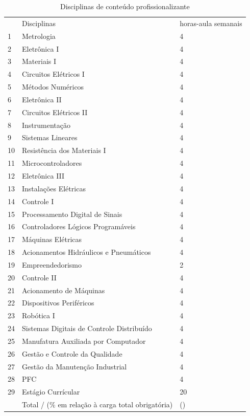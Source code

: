 \begin{destacar}
\begin{longtable}{|p{0.8cm}|p{7.5cm}|p{2.0cm}|}
	\caption{Disciplinas de conteúdo profissionalizante}\label{tab6} 
	\vspace{-0.25cm}
	\\ \hline 
	\cellcolor{\cinza} & \cellcolor{\cinza}Disciplinas & \cellcolor{\cinza}horas-aula semanais  \\ 
	\hline
	1 &  Metrologia  &  4 \\ \hline
	2 &  Eletrônica I  &  4 \\ \hline
	3 &  Materiais I  &  4 \\ \hline
	4 &  Circuitos Elétricos I  &  4 \\ \hline
	5 &  Métodos Numéricos  &  4 \\ \hline
	6 &  Eletrônica II  &  4 \\ \hline
	7 &  Circuitos Elétricos II  &  4 \\ \hline
	8 &  Instrumentação  &  4 \\ \hline
	9 &  Sistemas Lineares  &  4 \\ \hline
	10 &  Resistência dos Materiais I  &  4 \\ \hline
	11 &  Microcontroladores  &  4 \\ \hline
	12 &  Eletrônica III  &  4 \\ \hline
	13 &  Instalações Elétricas  &  4 \\ \hline
	14 &  Controle I  &  4 \\ \hline
	15 &  Processamento Digital de Sinais  &  4 \\ \hline
	16 &  Controladores Lógicos Programáveis  &  4 \\ \hline
	17 &  Máquinas Elétricas  &  4 \\ \hline
	18 &  Acionamentos Hidráulicos e Pneumáticos  &  4 \\ \hline
	19 &  Empreendedorismo  &  2 \\ \hline
	20 &  Controle II  &  4 \\ \hline
	21 &  Acionamento de Máquinas  &  4 \\ \hline
	22 &  Dispositivos Periféricos  &  4 \\ \hline
	23 &  Robótica I  &  4 \\ \hline
	24 &  Sistemas Digitais de Controle Distribuído  &  4 \\ \hline
	25 &  Manufatura Auxiliada por Computador  &  4 \\ \hline
	26 &  Gestão e Controle da Qualidade  &  4 \\ \hline
	27 &  Gestão da Manutenção Industrial &  4 \\ \hline
	28 &  PFC  &  4 \\ \hline
	29 &  Estágio Currícular  &  20 \\ \hline
	&  Total / (\% em relação à carga total obrigatória)  &  \CHPROFCR(\CHPROFPEMIN) \\ \hline
\end{longtable}


\end{destacar}
